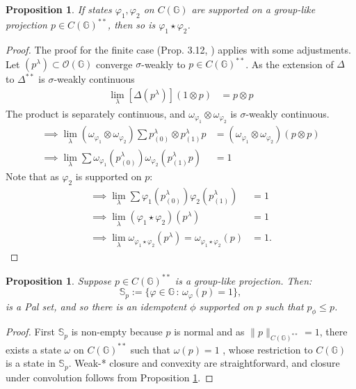 \documentclass[12pt]{amsart}
\newtheorem{proposition}[theorem]{Proposition}
\theoremstyle{remark}
\theoremstyle{remark}
\begin{document}
\begin{proposition}\label{support}
  If states $\varphi_1,\varphi_2$ on $C(\mathbb{G})$   are supported on a group-like projection $p\in C(\mathbb{G})^{**}$, then so is $\varphi_1\star \varphi_2$.
\end{proposition}
\begin{proof}
The proof for the finite case (Prop. 3.12, \cite{mc1}) applies with some adjustments.
 Let $(p^\lambda)\subset \mathcal{O}(\mathbb{G})$ converge $\sigma$-weakly to $p\in C(\mathbb{G})^{**}$. As the extension of $\Delta$ to $\Delta^{**}$ is $\sigma$-weakly continuous
\begin{align*}
  \lim_\lambda\left[\Delta(p^\lambda)\right](1\otimes p) & =p\otimes p
  \end{align*}
The product is separately continuous, and $\omega_{\varphi_1}\otimes\omega_{\varphi_2}$ is $\sigma$-weakly continuous.
  \begin{align*}
  \implies \lim_\lambda(\omega_{\varphi_1}\otimes\omega_{\varphi_2})\sum p^{\lambda}_{(0)}\otimes p^\lambda_{(1)}p & =(\omega_{\varphi_1}\otimes\omega_{\varphi_2})(p\otimes p) \\
  \implies \lim_\lambda \sum \omega_{\varphi_1}( p^{\lambda}_{(0)})\omega_{\varphi_2}(p^\lambda_{(1)}p) & =1
  \end{align*}
   Note that as $\varphi_2$ is supported on $p$:
  \begin{align*}
 \implies \lim_\lambda \sum \varphi_1( p^{\lambda}_{(0)})\varphi_2(p^\lambda_{(1)}) & =1
   \\ \implies \lim_\lambda (\varphi_1\star\varphi_2)(p^\lambda)&=1
   \\ \implies \lim_\lambda \omega_{\varphi_1\star\varphi_2}(p^\lambda)= \omega_{\varphi_1\star\varphi_2}(p)&=1.
\end{align*}

\end{proof}

\begin{proposition}\label{Palidemp}
Suppose $p\in C(\mathbb{G})^{**}$ is a group-like projection. Then:
$$\mathbb{S}_p:=\{\varphi\in\mathbb{G}\,\colon\,\omega_\varphi(p)=1\},$$
is a Pal set, and so there is an idempotent $\phi$ supported on $p$ such that $p_\phi\leq p$.
\end{proposition}
\begin{proof}
First $\mathbb{S}_p$ is non-empty because $p$ is normal and as $\|p\|_{C(\mathbb{G})^{**}}=1$,  there exists a state $\omega$ on $C(\mathbb{G})^{**}$ such that $\omega(p)=1$ \cite{mur}, whose restriction to $C(\mathbb{G})$ is a state in $\mathbb{S}_p$. Weak-* closure and convexity are straightforward, and closure under convolution follows from Proposition \ref{support}.
\end{proof}
\end{document}
